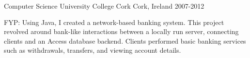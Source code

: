 


\begin{cventries}


\cventry
{Computer Science} %
{University College Cork} %
{Cork, Ireland} %
{2007-2012} %
{ %
\begin{cvitems}
\item {FYP: Using Java, I created a network-based banking system. This project revolved around bank-like interactions between a locally run server, connecting clients and an Access database backend. Clients performed basic banking services such as withdrawals, transfers, and viewing account details.}
\end{cvitems}
}


\end{cventries}

